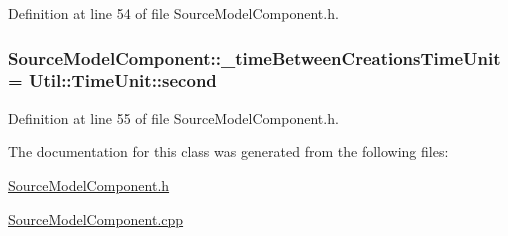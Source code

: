 Definition at line 54 of file Source\-Model\-Component.\-h.

\hypertarget{class_source_model_component_af34df20551bc223eb103ca87e9f1463e}{
\subsubsection[{\-\_\-time\-Between\-Creations\-Time\-Unit}]{ Source\-Model\-Component\-::\-\_\-time\-Between\-Creations\-Time\-Unit = {\bf Util\-::\-Time\-Unit\-::second}\hspace{0.3cm}{\ttfamily [protected]}}}\label{class_source_model_component_af34df20551bc223eb103ca87e9f1463e}


Definition at line 55 of file Source\-Model\-Component.\-h.



The documentation for this class was generated from the following files\-:\begin{DoxyCompactItemize}
\item 
\hyperlink{_source_model_component_8h}{Source\-Model\-Component.\-h}\item 
\hyperlink{_source_model_component_8cpp}{Source\-Model\-Component.\-cpp}\end{DoxyCompactItemize}
